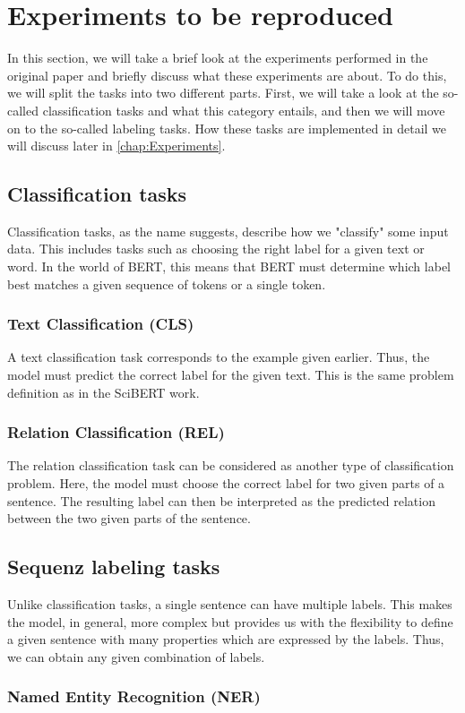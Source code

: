 \section{Experiments to be reproduced}
In this section, we will take a brief look at the experiments performed in the original paper and briefly discuss what these experiments are about. To do this, we will split the tasks into two different parts. First, we will take a look at the so-called classification tasks and what this category entails, and then we will move on to the so-called labeling tasks. How these tasks are implemented in detail we will discuss later in \autoref{chap:Experiments}.
\subsection{Classification tasks}
Classification tasks, as the name suggests, describe how we "classify" some input data. This includes tasks such as choosing the right label for a given text or word. In the world of BERT, this means that BERT must determine which label best matches a given sequence of tokens or a single token. 
\subsubsection{Text Classification (CLS)}
A text classification task corresponds to the example given earlier. Thus, the model must predict the correct label for the given text. This is the same problem definition as in the SciBERT work.
\subsubsection{Relation Classification (REL)}
The relation classification task can be considered as another type of classification problem. Here, the model must choose the correct label for two given parts of a sentence. The resulting label can then be interpreted as the predicted relation between the two given parts of the sentence.
\subsection{Sequenz labeling tasks}
Unlike classification tasks, a single sentence can have multiple labels. This makes the model, in general, more complex but provides us with the flexibility to define a given sentence with many properties which are expressed by the labels. Thus, we can obtain any given combination of labels.
\subsubsection{Named Entity Recognition (NER)}
